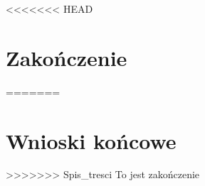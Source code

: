 \documentclass[document.tex]{subfiles}
\begin{document}
<<<<<<< HEAD
\chapter{Zakończenie}
=======
\chapter{Wnioski końcowe}
>>>>>>> Spis_tresci
To jest zakończenie
\end{document}
